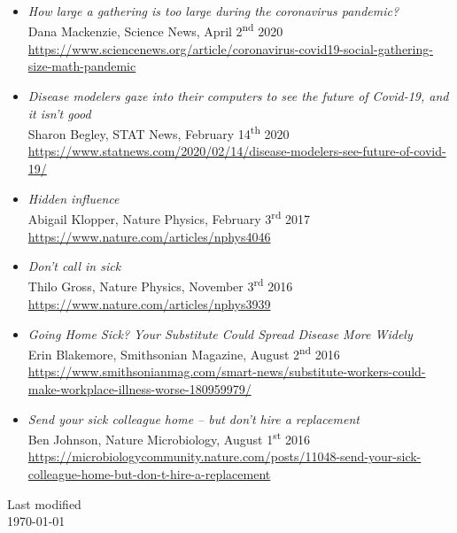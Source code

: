 \documentclass[11pt]{article}
\begin{document}
\begin{itemize}[itemsep=0.5em, first*=\small]
%
  \item \parbox[t]{0.9\textwidth}{\textit{How large a gathering is too large during the coronavirus pandemic?}\\
  {\small Dana Mackenzie, Science News, April 2\textsuperscript{nd} 2020}\\
  \footnotesize\url{https://www.sciencenews.org/article/coronavirus-covid19-social-gathering-size-math-pandemic}}
%
  \item \parbox[t]{0.9\textwidth}{\textit{Disease modelers gaze into their computers to see the future of Covid-19, and it isn’t good}\\
  {\small Sharon Begley, STAT News, February 14\textsuperscript{th} 2020}\\
  \footnotesize\url{https://www.statnews.com/2020/02/14/disease-modelers-see-future-of-covid-19/}}
%
  \item \parbox[t]{0.9\textwidth}{\textit{Hidden influence}\\
  {\small Abigail Klopper, Nature Physics, February 3\textsuperscript{rd} 2017}\\
  \footnotesize\url{https://www.nature.com/articles/nphys4046}}
%
  \item \parbox[t]{0.9\textwidth}{\textit{Don't call in sick}\\
  {\small Thilo Gross, Nature Physics, November 3\textsuperscript{rd} 2016}\\
  \footnotesize\url{https://www.nature.com/articles/nphys3939}}
%
  \item \parbox[t]{0.9\textwidth}{\textit{Going Home Sick? Your Substitute Could Spread Disease More Widely}\\
  {\small Erin Blakemore, Smithsonian Magazine, August 2\textsuperscript{nd} 2016}\\
  \footnotesize\url{https://www.smithsonianmag.com/smart-news/substitute-workers-could-make-workplace-illness-worse-180959979/}}
%
  \item \parbox[t]{0.9\textwidth}{\textit{Send your sick colleague home -- but don’t hire a replacement}\\
  {\small Ben Johnson, Nature Microbiology, August 1\textsuperscript{st} 2016}\\
  \footnotesize\url{https://microbiologycommunity.nature.com/posts/11048-send-your-sick-colleague-home-but-don-t-hire-a-replacement}}
%
\end{itemize}
%
%
%
%
%
\vfill
%
\begin{flushright}
  \tiny Last modified\\ \today
\end{flushright}
%
\end{document}
